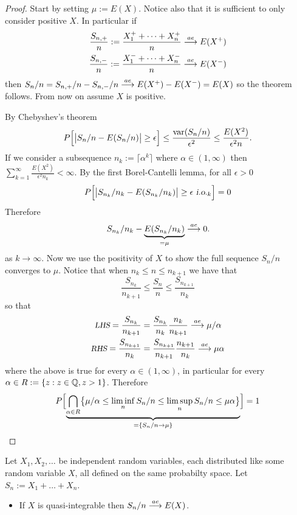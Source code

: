 \begin{proof}
Start by setting $\mu := E(X)$. Notice also that it is sufficient to only consider positive $X$. In particular if
\begin{align*}
\frac{S_{n,+}}{n}:= \frac{X_1^++ \cdots + X_n^+}{n} \overset{\small ae} \longrightarrow E(X^+) \\
\frac{S_{n,-}}{n}:= \frac{X_1^-+ \cdots + X_n^-}{n} \overset{\small ae} \longrightarrow E(X^-) 
\end{align*}
then $S_n/n = S_{n,+}/n - S_{n,-}/n \overset{\small ae} \longrightarrow E(X^+) - E(X^-) = E(X)$ so the theorem follows. From now on assume $X$ is positive.

By Chebyshev's theorem 
\begin{align*}
P\Bigl[\bigl| S_n/n - E(S_n/n)\bigr| \geq \epsilon \Bigr] \leq \frac{\text{var}(S_n/n)}{\epsilon^2}\leq \frac{E(X^2)}{\epsilon^2 n}.
\end{align*}
If we consider a subsequence $n_k:= \lceil \alpha^k \rceil$ where $\alpha \in (1,\infty)$ then $\sum_{k=1}^\infty \frac{E(X^2)}{\epsilon^2 n_k} < \infty$. By the first Borel-Cantelli lemma, for all $\epsilon>0$
\[  P\Bigl[\bigl| S_{n_k}/n_k - E(S_{n_k}/n_k)\bigr| \geq \epsilon {\,\,\text{\sl i.o.} }_k  \Bigr] =0 \]
Therefore
\[ S_{n_k}/n_k - \underbrace{E(S_{n_k}/n_k)}_{=\mu} \overset{\small ae} \longrightarrow 0. \]
as $k\rightarrow \infty$.
Now we use the positivity of $X$ to show the full sequence $S_n/n$ converges to $\mu$. Notice that when $n_k\leq n\leq n_{k+1}$ we have that 
\begin{equation}
\label{lift from sub sequence} 
\frac{S_{n_k}}{n_{k+1}}\leq \frac{S_n}{n} \leq \frac{S_{n_{k+1}}}{n_k}
\end{equation}
so that
\begin{align*}
\text{\sl \small LHS} = \frac{S_{n_k}}{n_{k+1}} & =  \frac{S_{n_k}}{n_{k}}\frac{n_k}{n_{k+1}} \overset{\small ae} \longrightarrow \mu/\alpha\\
\text{\sl \small RHS} = \frac{S_{n_{k+1}}}{n_k} & =  \frac{S_{n_{k+1}}}{n_{k+1}}\frac{n_{k+1}}{n_{k}} \overset{\small ae} \longrightarrow \mu\alpha
\end{align*}
where the above is true for every $\alpha\in (1,\infty)$, in particular for every $\alpha \in R:= \{z:z\in \Bbb Q, z>1\}$. Therefore
\[ P\Bigl[\underbrace{\bigcap_{\alpha \in R} \bigl\{ \mu/\alpha\leq \liminf_n  S_n/n  \leq \limsup_n S_n/n \leq \mu\alpha\bigr\}}_{=\{S_n/n \rightarrow \mu \}}\Bigr] = 1 \]
\end{proof}



\begin{theorem}
Let $X_1, X_2,\ldots$ be independent random variables, each distributed like some random variable $X$, all defined on the same probabilty space. Let $S_n:= X_1+\ldots+ X_n$.  
\begin{itemize}
\item If $X$ is quasi-integrable then $S_n/n \overset{\small ae} \longrightarrow E(X)$.
\end{itemize}
\end{theorem}

